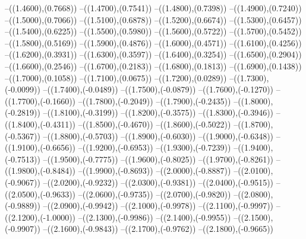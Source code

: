 {	--({\sx*(1.4600)},{\sy*(0.7668)})
	--({\sx*(1.4700)},{\sy*(0.7541)})
	--({\sx*(1.4800)},{\sy*(0.7398)})
	--({\sx*(1.4900)},{\sy*(0.7240)})
	--({\sx*(1.5000)},{\sy*(0.7066)})
	--({\sx*(1.5100)},{\sy*(0.6878)})
	--({\sx*(1.5200)},{\sy*(0.6674)})
	--({\sx*(1.5300)},{\sy*(0.6457)})
	--({\sx*(1.5400)},{\sy*(0.6225)})
	--({\sx*(1.5500)},{\sy*(0.5980)})
	--({\sx*(1.5600)},{\sy*(0.5722)})
	--({\sx*(1.5700)},{\sy*(0.5452)})
	--({\sx*(1.5800)},{\sy*(0.5169)})
	--({\sx*(1.5900)},{\sy*(0.4876)})
	--({\sx*(1.6000)},{\sy*(0.4571)})
	--({\sx*(1.6100)},{\sy*(0.4256)})
	--({\sx*(1.6200)},{\sy*(0.3931)})
	--({\sx*(1.6300)},{\sy*(0.3597)})
	--({\sx*(1.6400)},{\sy*(0.3254)})
	--({\sx*(1.6500)},{\sy*(0.2904)})
	--({\sx*(1.6600)},{\sy*(0.2546)})
	--({\sx*(1.6700)},{\sy*(0.2183)})
	--({\sx*(1.6800)},{\sy*(0.1813)})
	--({\sx*(1.6900)},{\sy*(0.1438)})
	--({\sx*(1.7000)},{\sy*(0.1058)})
	--({\sx*(1.7100)},{\sy*(0.0675)})
	--({\sx*(1.7200)},{\sy*(0.0289)})
	--({\sx*(1.7300)},{\sy*(-0.0099)})
	--({\sx*(1.7400)},{\sy*(-0.0489)})
	--({\sx*(1.7500)},{\sy*(-0.0879)})
	--({\sx*(1.7600)},{\sy*(-0.1270)})
	--({\sx*(1.7700)},{\sy*(-0.1660)})
	--({\sx*(1.7800)},{\sy*(-0.2049)})
	--({\sx*(1.7900)},{\sy*(-0.2435)})
	--({\sx*(1.8000)},{\sy*(-0.2819)})
	--({\sx*(1.8100)},{\sy*(-0.3199)})
	--({\sx*(1.8200)},{\sy*(-0.3575)})
	--({\sx*(1.8300)},{\sy*(-0.3946)})
	--({\sx*(1.8400)},{\sy*(-0.4311)})
	--({\sx*(1.8500)},{\sy*(-0.4670)})
	--({\sx*(1.8600)},{\sy*(-0.5022)})
	--({\sx*(1.8700)},{\sy*(-0.5367)})
	--({\sx*(1.8800)},{\sy*(-0.5703)})
	--({\sx*(1.8900)},{\sy*(-0.6030)})
	--({\sx*(1.9000)},{\sy*(-0.6348)})
	--({\sx*(1.9100)},{\sy*(-0.6656)})
	--({\sx*(1.9200)},{\sy*(-0.6953)})
	--({\sx*(1.9300)},{\sy*(-0.7239)})
	--({\sx*(1.9400)},{\sy*(-0.7513)})
	--({\sx*(1.9500)},{\sy*(-0.7775)})
	--({\sx*(1.9600)},{\sy*(-0.8025)})
	--({\sx*(1.9700)},{\sy*(-0.8261)})
	--({\sx*(1.9800)},{\sy*(-0.8484)})
	--({\sx*(1.9900)},{\sy*(-0.8693)})
	--({\sx*(2.0000)},{\sy*(-0.8887)})
	--({\sx*(2.0100)},{\sy*(-0.9067)})
	--({\sx*(2.0200)},{\sy*(-0.9232)})
	--({\sx*(2.0300)},{\sy*(-0.9381)})
	--({\sx*(2.0400)},{\sy*(-0.9515)})
	--({\sx*(2.0500)},{\sy*(-0.9633)})
	--({\sx*(2.0600)},{\sy*(-0.9735)})
	--({\sx*(2.0700)},{\sy*(-0.9820)})
	--({\sx*(2.0800)},{\sy*(-0.9889)})
	--({\sx*(2.0900)},{\sy*(-0.9942)})
	--({\sx*(2.1000)},{\sy*(-0.9978)})
	--({\sx*(2.1100)},{\sy*(-0.9997)})
	--({\sx*(2.1200)},{\sy*(-1.0000)})
	--({\sx*(2.1300)},{\sy*(-0.9986)})
	--({\sx*(2.1400)},{\sy*(-0.9955)})
	--({\sx*(2.1500)},{\sy*(-0.9907)})
	--({\sx*(2.1600)},{\sy*(-0.9843)})
	--({\sx*(2.1700)},{\sy*(-0.9762)})
	--({\sx*(2.1800)},{\sy*(-0.9665)})
}

